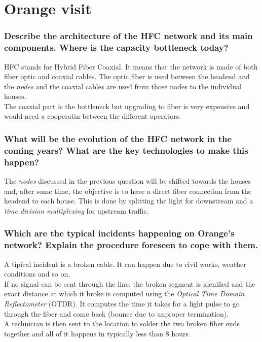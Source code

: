 \documentclass[10pt,a4paper]{ULBreport}
\begin{document}
\chapter{Orange visit}

\subsection{Describe the architecture of the HFC network and its main components. Where
is the capacity bottleneck today?}

HFC stands for Hybrid Fiber Coaxial. It means that the network is made of both fiber optic and coaxial cables. The optic fiber is used between the headend and the \textit{nodes} and the coaxial cables are used from those nodes to the individual houses. \\
The coaxial part is the bottleneck but upgrading to fiber is very expensive and would need a cooperatin between the different operators.

\subsection{What will be the evolution of the HFC network in the coming years? What are the key technologies to make this happen?}

The \textit{nodes} discussed in the previous question will be shifted towards the houses and, after some time, the objective is to have a direct fiber connection from the headend to each house. This is done by splitting the light for downstream and a \textit{time division multiplexing} for upstream traffic. 

\subsection{Which are the typical incidents happening on Orange's network? Explain the procedure foreseen to cope with them.}

A tipical incident is a broken cable. It can happen due to civil works, weather conditions and so on. \\
If no signal can be sent through the line, the broken segment is idenified and the exact distance at which it broke is computed using the \textit{Optical Time Domain Reflectometer} (OTDR). It computes the time it takes for a light pulse to go through the fiber and come back (bounce due to unproper termination).\\
A technician is then sent to the location to solder the two broken fiber ends together and all of it happens in typically less than 8 hours.
\end{document}
